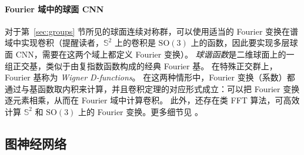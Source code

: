 \paragraph{Fourier 域中的球面 CNN}
对于第~\ref{sec:groups} 节所见的球面连续对称群，可以使用适当的 Fourier 变换在谱域中实现卷积（提醒读者，$\mathbb{S}^2$ 上的卷积是 $\mathrm{SO}(3)$ 上的函数，因此要实现多层球面 CNN，需要在这两个域上都定义 Fourier 变换）。
%
{\em 球谐函数}是二维球面上的一组正交基，类似于由复指数函数构成的经典 Fourier 基。
%
在特殊正交群上，Fourier 基称为 {\em Wigner D-functions}。%
在这两种情形中，Fourier 变换（系数）都通过与基函数取内积来计算，并且卷积定理的对应形式成立：可以把 Fourier 变换逐元素相乘，从而在 Fourier 域中计算卷积。
%
此外，还存在类 FFT 算法，可高效计算 $\mathbb{S}^2$ 和 $\mathrm{SO}(3)$ 上的 Fourier 变换。更多细节见 \cite{cohen2018spherical}。



%





\subsection{图神经网络}\label{sec:gnn-intro}



